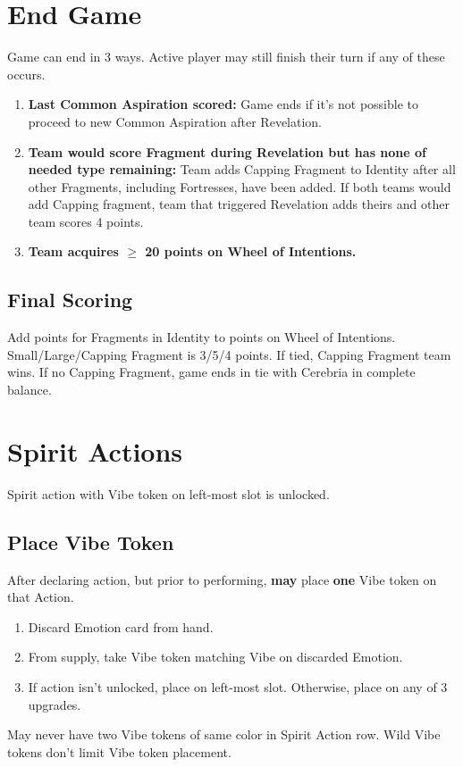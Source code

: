 \documentclass[10pt]{article}
\newenvironment{enumerateCustom}
{\begin{enumerate}
  \setlength{\itemsep}{1pt}
  \setlength{\parskip}{0pt}
  \setlength{\parsep}{0pt}}
{\end{enumerate}}
\begin{document}
\begin{multicols*}{2}
\section*{End Game}
Game can end in 3 ways. Active player may still finish their turn if any of these occurs.
\begin{enumerateCustom}
    \item \textbf{Last Common Aspiration scored:} Game ends if it's not possible to proceed to new Common Aspiration after Revelation.
    \item \textbf{Team would score Fragment during Revelation but has none of needed type remaining:} Team adds Capping Fragment to Identity after all other Fragments, including Fortresses, have been added. If both teams would add Capping fragment, team that triggered Revelation adds theirs and other team scores 4 points.
    \item \textbf{Team acquires $\ge$ 20 points on Wheel of Intentions.}
\end{enumerateCustom}

\subsection*{Final Scoring}
Add points for Fragments in Identity to points on Wheel of Intentions. Small/Large/Capping Fragment is 3/5/4 points. If tied, Capping Fragment team wins. If no Capping Fragment, game ends in tie with Cerebria in complete balance.

\section*{Spirit Actions}
Spirit action with Vibe token on left-most slot is unlocked. 

\subsection*{Place Vibe Token}
After declaring action, but prior to performing, \textbf{may} place \textbf{one} Vibe token on that Action.
\begin{enumerateCustom}
    \item Discard Emotion card from hand.
    \item From supply, take Vibe token matching Vibe on discarded Emotion.
    \item If action isn't unlocked, place on left-most slot. Otherwise, place on any of 3 upgrades.
\end{enumerateCustom}
May never have two Vibe tokens of same color in Spirit Action row. Wild Vibe tokens don't limit Vibe token placement.


\end{multicols*}
\end{document}
